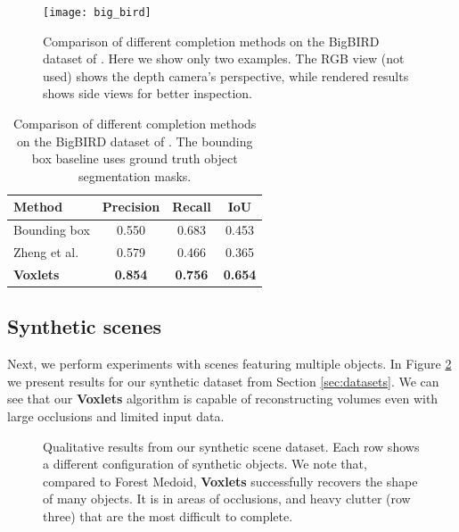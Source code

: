 \documentclass[10pt,twocolumn,letterpaper]{article}
\makeatletter
\newcommand*{\ea}{et al.\@\xspace}
\makeatother
\begin{document}
\begin{figure}[t]
     \texttt{[image: big\_bird]}
         \caption{Comparison of different completion methods on the BigBIRD dataset of \cite{singh-icra-2014}. Here we show only two examples. The RGB view (not used) shows the depth camera's perspective, while rendered results shows side views for better inspection.}
    \label{fig:big_bird}
\end{figure}


\begin{table}
  \centering
  \begin{tabular}{|p{2.5cm}|c|c|c|}
  \hline
  \textbf{Method}  &   \textbf{Precision} & \textbf{Recall}& \textbf{IoU}\\
  \hline
  Bounding box & 0.550 & 0.683  & 0.453 \\
  Zheng \ea \cite{zheng-cvpr-2013} & 0.579 & 0.466  & 0.365 \\
  \hline
  {\bf Voxlets} & {\bf 0.854} & {\bf 0.756} & {\bf 0.654} \\
  \hline
  \end{tabular}
  \vspace{5pt}
  \caption{Comparison of different completion methods on the BigBIRD dataset of \cite{singh-icra-2014}. The bounding box baseline uses ground truth object segmentation masks.}
    \label{tab:big_bird_quant_results}
    \vspace{-5pt}
\end{table}




\subsection{Synthetic scenes}
\label{sec:exp_synth}
Next, we perform experiments with scenes featuring multiple objects.
In Figure \ref{fig:synth_results} we present results for our synthetic dataset from Section \ref{sec:datasets}.
We can see that our {\bf Voxlets} algorithm is capable of reconstructing volumes even with large occlusions and limited input data.

\newcommand{\turnheight}{0.36\columnwidth}
\begin{figure}[!t]
    
    \vspace{2pt}
     \caption{
     Qualitative results from our synthetic scene dataset.
     Each row shows a different configuration of synthetic objects.
     We note that, compared to Forest Medoid, {\bf Voxlets} successfully recovers the shape of many objects.
     It is in areas of occlusions, and heavy clutter (row three) that are the most difficult to complete.
     }
     \label{fig:synth_results}
\end{figure}
\end{document}
